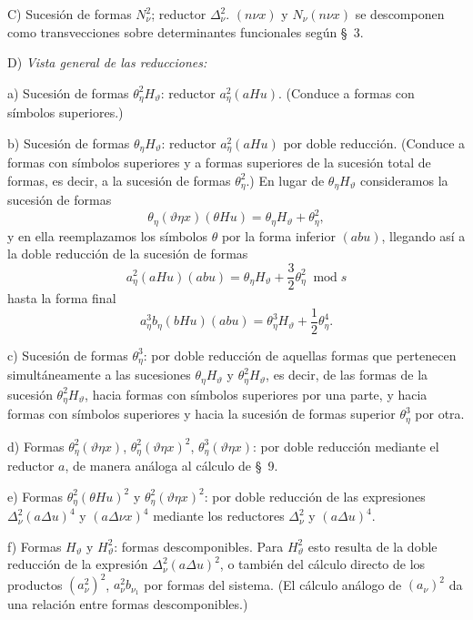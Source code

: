 \documentclass[11pt]{article}
\newcommand{\A}{\Delta}
\newcommand{\modu}[1]{\;\operatorname{mod} #1}
\begin{document}
\noindent C) Sucesión de formas $N_\nu^2$; reductor $\A_\nu^2$. $(n\nu x)$ y $N_\nu(n\nu x)$ se descomponen como transvecciones sobre determinantes funcionales según \S\ 3.

\noindent D) \emph{Vista general de las reducciones:}

a) Sucesión de formas $\theta_\eta^2H_\vartheta$: reductor $a_\eta^2(aHu)$. (Conduce a formas con símbolos superiores.)

b) Sucesión de formas $\theta_\eta H_\vartheta$: reductor $a_\eta^2(aHu)$ por doble reducción. (Conduce a formas con símbolos superiores y a formas superiores de la sucesión total de formas, es decir, a la sucesión de formas $\theta_\eta^2$.) En lugar de $\theta_\eta H_\vartheta$ consideramos la sucesión de formas
\[
\theta_\eta(\vartheta\eta x)(\theta Hu)=\theta_\eta H_\vartheta+\theta_\eta^2,
\]
y en ella reemplazamos los símbolos $\theta$ por la forma inferior $(abu)$, llegando así a la doble reducción de la sucesión de formas
\[
a_\eta^2(aHu)(abu)=\theta_\eta H_\vartheta+\frac32\theta_\eta^2\modu{s}
\]
hasta la forma final
\[
a_\eta^3b_\eta(bHu)(abu)=\theta_\eta^3H_\vartheta+\frac12\theta_\eta^4.
\]

c) Sucesión de formas $\theta_\eta^3$: por doble reducción de aquellas formas que pertenecen simultáneamente a las sucesiones $\theta_\eta H_\vartheta$ y $\theta_\eta^2H_\vartheta$, es decir, de las formas de la sucesión $\theta_\eta^2H_\vartheta$, hacia formas con símbolos superiores por una parte, y hacia formas con símbolos superiores y hacia la sucesión de formas superior $\theta_\eta^3$ por otra.

d) Formas $\theta_\eta^2(\vartheta\eta x)$, $\theta_\eta^2(\vartheta\eta x)^2$, $\theta_\eta^3(\vartheta\eta x)$: por doble reducción mediante el reductor $a$, de manera análoga al cálculo de \S\ 9.

e) Formas $\theta_\eta^2(\theta Hu)^2$ y $\theta_\eta^2(\vartheta\eta x)^2$: por doble reducción de las expresiones $\A_\nu^2(a\A u)^4$ y $(a\A\nu x)^4$ mediante los reductores $\A_\nu^2$ y $(a\A u)^4$.

f) Formas $H_\vartheta$ y $H_\vartheta^2$: formas descomponibles. Para $H_\vartheta^2$ esto resulta de la doble reducción de la expresión $\A_\nu^2(a\A u)^2$, o también del cálculo directo de los productos $(a_\nu^2)^2$, $a_\nu^2b_{\nu_1}$ por formas del sistema. (El cálculo análogo de $(a_\nu)^2$ da una relación entre formas descomponibles.)
\end{document}
